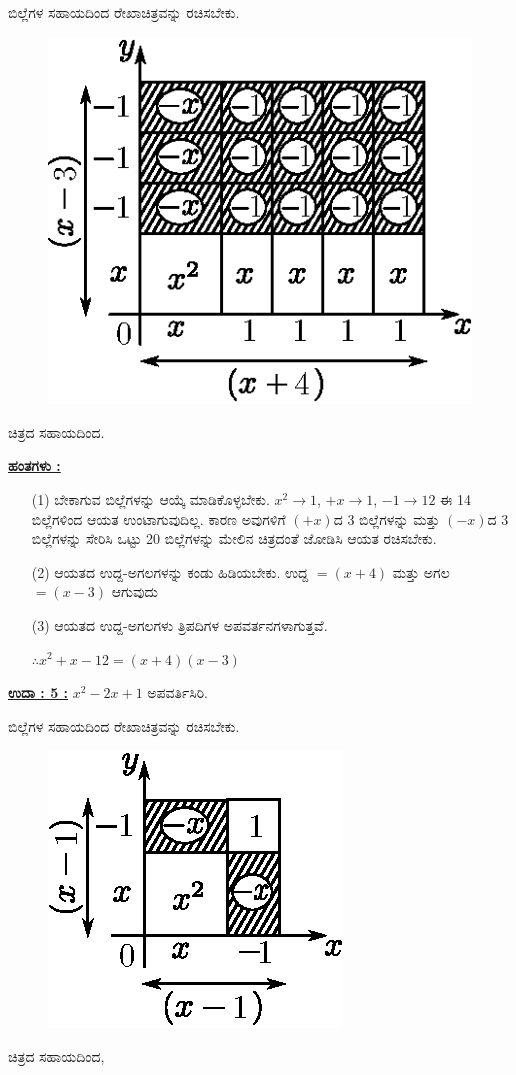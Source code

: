 ಬಿಲ್ಲೆಗಳ ಸಹಾಯದಿಂದ ರೇಖಾಚಿತ್ರವನ್ನು ರಚಿಸಬೇಕು.
\begin{figure}[H]
\centering
\includegraphics[scale=0.9]{src/figure/chap3/fig3-42.eps}
\end{figure}

ಚಿತ್ರದ ಸಹಾಯದಿಂದ.

\noindent
{\textbf{\underline{ಹಂತಗಳು :}}}
\begin{itemize}
\item [(1)] ಬೇಕಾಗುವ ಬಿಲ್ಲೆಗಳನ್ನು ಆಯ್ಕೆ ಮಾಡಿಕೊಳ್ಳಬೇಕು. $x^2 \rightarrow 1$, $+x \rightarrow 1$, $-1 \rightarrow 12$ ಈ 14 ಬಿಲ್ಲೆಗಳಿಂದ ಆಯತ ಉಂಟಾಗುವುದಿಲ್ಲ. ಕಾರಣ ಅವುಗಳಿಗೆ $(+x)$ದ 3 ಬಿಲ್ಲೆಗಳನ್ನು ಮತ್ತು $(-x)$ದ 3 ಬಿಲ್ಲೆಗಳನ್ನು ಸೇರಿಸಿ ಒಟ್ಟು 20 ಬಿಲ್ಲೆಗಳನ್ನು ಮೇಲಿನ ಚಿತ್ರದಂತೆ ಜೋಡಿಸಿ ಆಯತ ರಚಿಸಬೇಕು. 
\item [(2)] ಆಯತದ ಉದ್ದ-ಅಗಲಗಳನ್ನು ಕಂಡು ಹಿಡಿಯಬೇಕು. ಉದ್ದ $= (x+4)$ ಮತ್ತು ಅಗಲ $= (x-3)$ ಆಗುವುದು 
\item [(3)] ಆಯತದ ಉದ್ದ-ಅಗಲಗಳು ತ್ರಿಪದಿಗಳ ಅಪವರ್ತನಗಳಾಗುತ್ತವೆ. 

$\therefore x^2 + x - 12 = (x+4)(x-3)$
\end{itemize}

\noindent
{\textbf{\underline{ಉದಾ : 5 :}}} $x^2 - 2x + 1$ ಅಪವರ್ತಿಸಿರಿ. 

ಬಿಲ್ಲೆಗಳ ಸಹಾಯದಿಂದ ರೇಖಾಚಿತ್ರವನ್ನು ರಚಿಸಬೇಕು.
\begin{figure}[H]
\centering
\includegraphics[scale=0.8]{src/figure/chap3/fig3-43.eps}
\end{figure}
ಚಿತ್ರದ ಸಹಾಯದಿಂದ,

